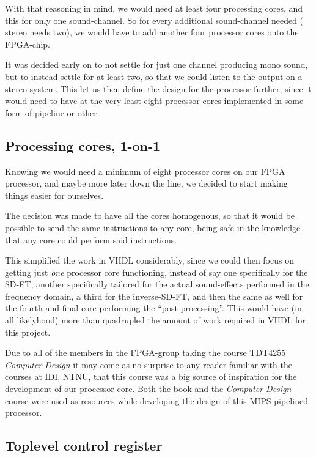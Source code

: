 With that reasoning in mind, we would need at least four processing cores, and
this for only one sound-channel. So for every additional sound-channel needed (
stereo needs two), we would have to add another four processor cores onto the
FPGA-chip.

It was decided early on to not settle for just one channel producing mono sound,
but to instead settle for at least two, so that we could listen to the output
on a stereo system. This let us then define the design for the processor
further, since it would need to have at the very least eight processor cores
implemented in some form of pipeline or other.

\subsection{Processing cores, 1-on-1}

Knowing we would need a minimum of eight processor cores on our FPGA processor,
and maybe more later down the line, we decided to start making things easier
for ourselves.

The decision was made to have all the cores homogenous, so that it would be
possible to send the same instructions to any core, being safe in the knowledge
that any core could perform said instructions.

This simplified the work in VHDL considerably, since we could then focus on
getting just \emph{one} processor core functioning, instead of say one
specifically for the SD-FT, another specifically tailored for the actual
sound-effects performed in the frequency domain, a third for the inverse-SD-FT,
and then the same as well for the fourth and final core performing the
``post-processing''. This would have (in all likelyhood) more than quadrupled
the amount of work required in VHDL for this project.

Due to all of the members in the FPGA-group taking the course TDT4255 \emph{
Computer Design} it may come as no surprise to any reader familiar with the
courses at IDI, NTNU, that this course was a big source of inspiration for the
development of our processor-core. Both the book\cite{tdt4255-book} and the
\emph{Computer Design} course were used as resources while developing the design
of this MIPS pipelined processor.

\subsection{Toplevel control register}\label{subsection:fpga-design-toplevel}

